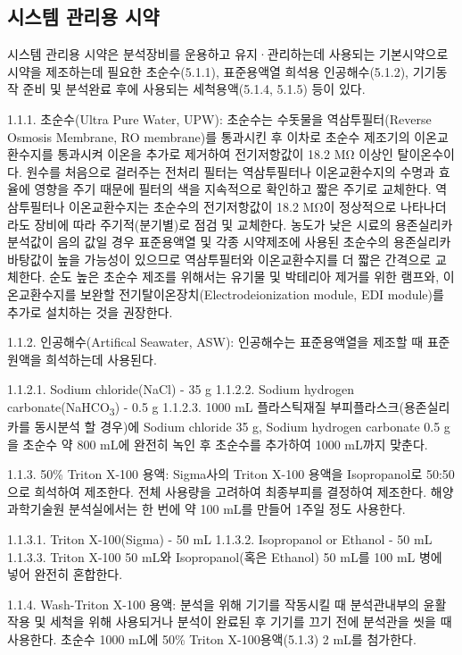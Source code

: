 \documentclass[
]{book}
\begin{document}
\hypertarget{uxc2dcuxc2a4uxd15c-uxad00uxb9acuxc6a9-uxc2dcuxc57d-1}{%
\subsection{시스템 관리용 시약}\label{uxc2dcuxc2a4uxd15c-uxad00uxb9acuxc6a9-uxc2dcuxc57d-1}}

시스템 관리용 시약은 분석장비를 운용하고 유지·관리하는데 사용되는 기본시약으로 시약을 제조하는데 필요한 초순수(5.1.1), 표준용액열 희석용 인공해수(5.1.2), 기기동작 준비 및 분석완료 후에 사용되는 세척용액(5.1.4, 5.1.5) 등이 있다.

1.1.1. 초순수(Ultra Pure Water, UPW): 초순수는 수돗물을 역삼투필터(Reverse Osmosis Membrane, RO membrane)를 통과시킨 후 이차로 초순수 제조기의 이온교환수지를 통과시켜 이온을 추가로 제거하여 전기저항값이 18.2 MΩ 이상인 탈이온수이다. 원수를 처음으로 걸러주는 전처리 필터는 역삼투필터나 이온교환수지의 수명과 효율에 영향을 주기 때문에 필터의 색을 지속적으로 확인하고 짧은 주기로 교체한다. 역삼투필터나 이온교환수지는 초순수의 전기저항값이 18.2 MΩ이 정상적으로 나타나더라도 장비에 따라 주기적(분기별)로 점검 및 교체한다. 농도가 낮은 시료의 용존실리카 분석값이 음의 값일 경우 표준용액열 및 각종 시약제조에 사용된 초순수의 용존실리카 바탕값이 높을 가능성이 있으므로 역삼투필터와 이온교환수지를 더 짧은 간격으로 교체한다. 순도 높은 초순수 제조를 위해서는 유기물 및 박테리아 제거를 위한 램프와, 이온교환수지를 보완할 전기탈이온장치(Electrodeionization module, EDI module)를 추가로 설치하는 것을 권장한다.

1.1.2. 인공해수(Artifical Seawater, ASW): 인공해수는 표준용액열을 제조할 때 표준원액을 희석하는데 사용된다.

1.1.2.1. Sodium chloride(NaCl) - 35 g
1.1.2.2. Sodium hydrogen carbonate(NaHCO\textsubscript{3}) - 0.5 g
1.1.2.3. 1000 mL 플라스틱재질 부피플라스크(용존실리카를 동시분석 할 경우)에 Sodium chloride 35 g, Sodium hydrogen carbonate 0.5 g을 초순수 약 800 mL에 완전히 녹인 후 초순수를 추가하여 1000 mL까지 맞춘다.

1.1.3. 50\% Triton X-100 용액: Sigma사의 Triton X-100 용액을 Isopropanol로 50:50으로 희석하여 제조한다. 전체 사용량을 고려하여 최종부피를 결정하여 제조한다. 해양과학기술원 분석실에서는 한 번에 약 100 mL를 만들어 1주일 정도 사용한다.

1.1.3.1. Triton X-100(Sigma) - 50 mL
1.1.3.2. Isopropanol or Ethanol - 50 mL
1.1.3.3. Triton X-100 50 mL와 Isopropanol(혹은 Ethanol) 50 mL를 100 mL 병에 넣어 완전히 혼합한다.

1.1.4. Wash-Triton X-100 용액: 분석을 위해 기기를 작동시킬 때 분석관내부의 윤활 작용 및 세척을 위해 사용되거나 분석이 완료된 후 기기를 끄기 전에 분석관을 씻을 때 사용한다. 초순수 1000 mL에 50\% Triton X-100용액(5.1.3) 2 mL를 첨가한다.
\end{document}
